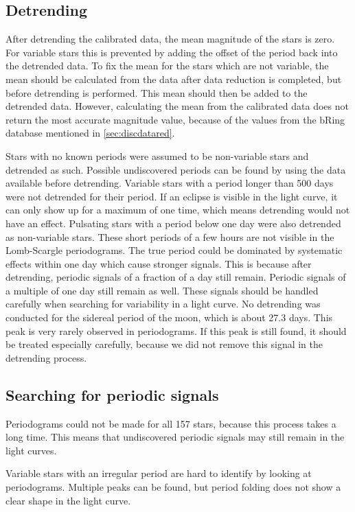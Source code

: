 \documentclass{aa}
\begin{document}
\subsection{Detrending}
After detrending the calibrated data, the mean magnitude of the stars is zero. For variable stars this is prevented by adding the offset of the period back into the detrended data. To fix the mean for the stars which are not variable, the mean should be calculated from the data after data reduction is completed, but before detrending is performed. This mean should then be added to the detrended data. However, calculating the mean from the calibrated data does not return the most accurate magnitude value, because of the values from the bRing database mentioned in \ref{sec:discdatared}.

Stars with no known periods were assumed to be non-variable stars and detrended as such. Possible undiscovered periods can be found by using the data available before detrending.
%
Variable stars with a period longer than 500 days were not detrended for their period. If an eclipse is visible in the light curve, it can only show up for a maximum of one time, which means detrending would not have an effect.
%
Pulsating stars with a period below one day were also detrended as non-variable stars. These short periods of a few hours are not visible in the Lomb-Scargle periodograms. The true period could be dominated by systematic effects within one day which cause stronger signals. This is because after detrending, periodic signals of a fraction of a day still remain. Periodic signals of a multiple of one day still remain as well. These signals should be handled carefully when searching for variability in a light curve.
%
No detrending was conducted for the sidereal period of the moon, which is about 27.3 days. This peak is very rarely observed in periodograms. If this peak is still found, it should be treated especially carefully, because we did not remove this signal in the detrending process.

\subsection{Searching for periodic signals}
Periodograms could not be made for all 157 stars, because this process takes a long time. This means that undiscovered periodic signals may still remain in the light curves.

Variable stars with an irregular period are hard to identify by looking at periodograms. Multiple peaks can be found, but period folding does not show a clear shape in the light curve.
\end{document}
